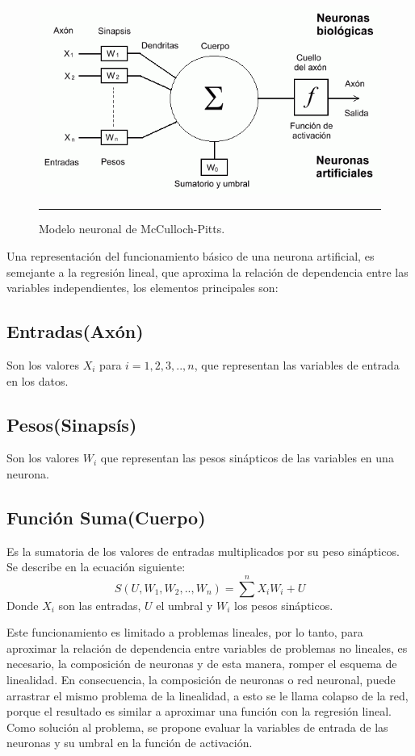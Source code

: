 \documentclass[11pt,titlepage]{report}
\begin{document}
\begin{figure}[h]
	\centering
	\includegraphics[scale=0.7]{Pic/03-SA} 
	\caption{Modelo neuronal de McCulloch-Pitts.\cite{Int11}}
	\hrule
\end{figure}
Una representación del funcionamiento básico de una neurona artificial, es semejante a la regresión lineal, que aproxima la relación de dependencia entre las variables independientes, los elementos principales son:
\subsection{Entradas(Axón)}
Son los valores $X_i$ para $i=1,2,3, .., n$, que representan las variables de entrada en los datos.

\subsection{Pesos(Sinapsís)}
Son los valores $W_i$ que representan las pesos sinápticos de las variables en una neurona.


\subsection{Función Suma(Cuerpo)}
Es la sumatoria de los valores de entradas multiplicados por su peso sinápticos. Se describe en la ecuación siguiente:
\[ S(U, W_1, W_2, .., W_n) = \sum^{n} X_i W_i + U\]
Donde $X_i$ son las entradas, $U$ el umbral y $W_i$ los pesos sinápticos.

Este funcionamiento es limitado a problemas lineales, por lo tanto, para aproximar la relación de dependencia entre variables de problemas no lineales, es necesario, la composición de neuronas y de esta manera, romper el esquema de linealidad. En consecuencia, la composición de neuronas o red neuronal, puede arrastrar el mismo problema de la linealidad, a esto se le llama colapso de la red, porque el resultado es similar a aproximar una función con la regresión lineal. Como solución al problema, se propone evaluar la variables de entrada de las neuronas y su umbral en la función de activación.      
\end{document}
